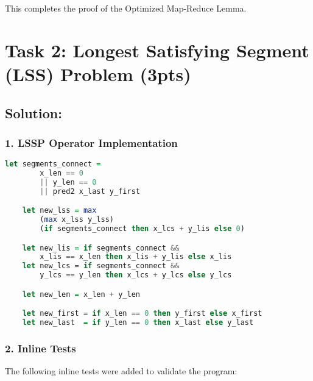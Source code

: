 \documentclass{article}
\begin{document}
This completes the proof of the Optimized Map-Reduce Lemma.

\section{Task 2: Longest Satisfying Segment (LSS) Problem (3pts)}
    \subsection*{Solution:}

    \subsubsection*{1. LSSP Operator Implementation}
    \begin{lstlisting}[language=Haskell]
    let segments_connect = 
        x_len == 0 
        || y_len == 0 
        || pred2 x_last y_first

    let new_lss = max 
        (max x_lss y_lss) 
        (if segments_connect then x_lcs + y_lis else 0)

    let new_lis = if segments_connect && 
        x_lis == x_len then x_lis + y_lis else x_lis
    let new_lcs = if segments_connect && 
        y_lcs == y_len then x_lcs + y_lcs else y_lcs

    let new_len = x_len + y_len

    let new_first = if x_len == 0 then y_first else x_first
    let new_last  = if y_len == 0 then x_last else y_last
    \end{lstlisting}

    \subsubsection*{2. Inline Tests}
    The following inline tests were added to validate the program:
\end{document}
